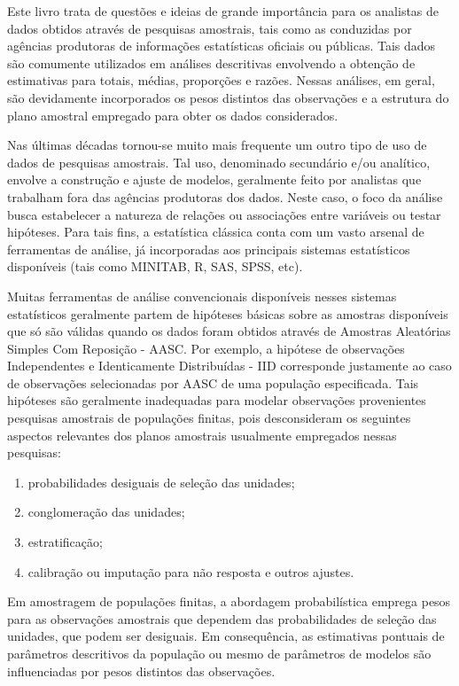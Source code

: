 \documentclass[
  12pt,
  brazilian,
]{book}
\theoremstyle{definition}
\theoremstyle{definition}
\theoremstyle{definition}
\theoremstyle{definition}
\theoremstyle{remark}
\begin{document}
Este livro trata de questões e ideias de grande importância para os analistas de dados obtidos através de pesquisas amostrais, tais como as conduzidas por agências produtoras de informações estatísticas oficiais ou públicas. Tais dados são comumente utilizados em análises descritivas envolvendo a obtenção de estimativas para totais, médias, proporções e razões. Nessas análises, em geral, são devidamente incorporados os pesos distintos das observações e a estrutura do plano amostral empregado para obter os dados considerados.

Nas últimas décadas tornou-se muito mais frequente um outro tipo de uso de dados de pesquisas amostrais. Tal uso, denominado secundário e/ou analítico, envolve a construção e ajuste de modelos, geralmente feito por analistas que trabalham fora das agências produtoras dos dados. Neste caso, o foco da análise busca estabelecer a natureza de relações ou associações entre variáveis ou testar hipóteses. Para tais fins, a estatística clássica conta com um vasto arsenal de ferramentas de análise, já incorporadas aos principais sistemas estatísticos disponíveis (tais como MINITAB, R, SAS, SPSS, etc).

Muitas ferramentas de análise convencionais disponíveis nesses sistemas estatísticos geralmente partem de hipóteses básicas sobre as amostras disponíveis que só são válidas quando os dados foram obtidos através de Amostras Aleatórias Simples Com Reposição - AASC. Por exemplo, a hipótese de observações Independentes e Identicamente Distribuídas - IID corresponde justamente ao caso de observações selecionadas por AASC de uma população especificada. Tais hipóteses são geralmente inadequadas para modelar observações provenientes
pesquisas amostrais de populações finitas, pois desconsideram os seguintes aspectos relevantes dos planos amostrais usualmente empregados nessas pesquisas:

\begin{enumerate}
\def\labelenumi{\roman{enumi})}
\item
  probabilidades desiguais de seleção das unidades;
\item
  conglomeração das unidades;
\item
  estratificação;
\item
  calibração ou imputação para não resposta e outros ajustes.
\end{enumerate}

Em amostragem de populações finitas, a abordagem probabilística emprega pesos para as observações amostrais que dependem das probabilidades de seleção das unidades, que podem ser desiguais. Em consequência, as estimativas pontuais de parâmetros descritivos da população ou mesmo de parâmetros de modelos são influenciadas por pesos distintos das observações.
\end{document}
